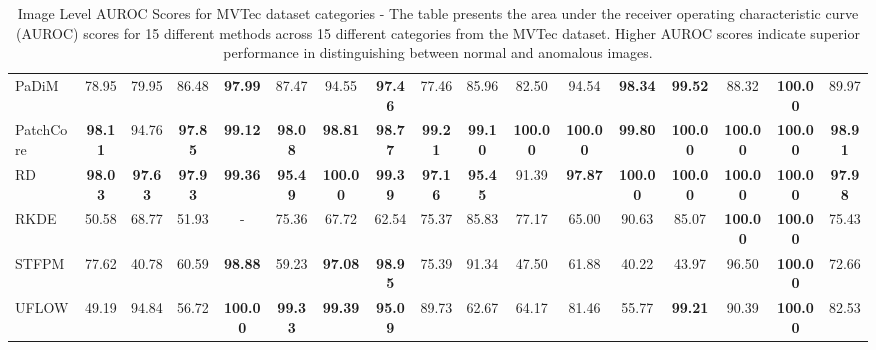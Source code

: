 \begin{table}[h!]
{\begin{tabular}{l*{16}{c}}
        PaDiM & 78.95 & 79.95 & 86.48 & \textbf{97.99} & 87.47 & 94.55 & \textbf{97.46} & 77.46 & 85.96 & 82.50 & 94.54 & \textbf{98.34} & \textbf{99.52} & 88.32 & \textbf{100.00} & 89.97 \\
        PatchCore & \textbf{98.11} & 94.76 & \textbf{97.85} & \textbf{99.12} & \textbf{98.08} & \textbf{98.81} & \textbf{98.77} & \textbf{99.21} & \textbf{99.10} & \textbf{100.00} & \textbf{100.00} & \textbf{99.80} & \textbf{100.00} & \textbf{100.00} & \textbf{100.00} & \textbf{98.91} \\
        RD & \textbf{98.03} & \textbf{97.63} & \textbf{97.93} & \textbf{99.36} & \textbf{95.49} & \textbf{100.00} & \textbf{99.39} & \textbf{97.16} & \textbf{95.45} & 91.39 & \textbf{97.87} & \textbf{100.00} & \textbf{100.00} & \textbf{100.00} & \textbf{100.00} & \textbf{97.98} \\
        RKDE & 50.58 & 68.77 & 51.93 & - & 75.36 & 67.72 & 62.54 & 75.37 & 85.83 & 77.17 & 65.00 & 90.63 & 85.07 & \textbf{100.00} & \textbf{100.00} & 75.43 \\
        STFPM & 77.62 & 40.78 & 60.59 & \textbf{98.88} & 59.23 & \textbf{97.08} & \textbf{98.95} & 75.39 & 91.34 & 47.50 & 61.88 & 40.22 & 43.97 & 96.50 & \textbf{100.00} & 72.66 \\
        UFLOW & 49.19 & 94.84 & 56.72 & \textbf{100.00} & \textbf{99.33} & \textbf{99.39} & \textbf{95.09} & 89.73 & 62.67 & 64.17 & 81.46 & 55.77 & \textbf{99.21} & 90.39 & \textbf{100.00} & 82.53 \\
        \bottomrule
    \end{tabular}
    }
    \caption{Image Level AUROC Scores for MVTec\cite{Bergmann_2019_CVPR} dataset categories - The table presents the area under the receiver operating characteristic curve (AUROC) scores for 15 different methods across 15 different categories from the MVTec dataset. Higher AUROC scores indicate superior performance in distinguishing between normal and anomalous images.}
    \label{table:MVTec Image AUROC}
\end{table}